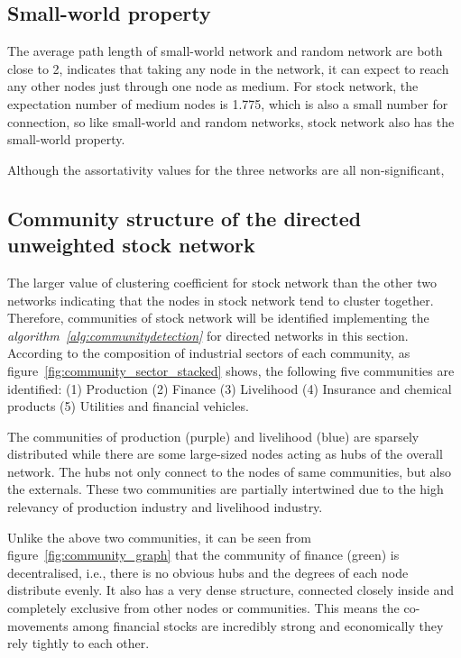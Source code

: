 \subsection{Small-world property}
The average path length of small-world network and random network are both close to 2, indicates that taking any node in the network, it can expect to reach any other nodes just through one node as medium. For stock network, the expectation number of medium nodes is 1.775, which is also a small number for connection, so like small-world and random networks, stock network also has the small-world property.


Although the assortativity values for the three networks are all non-significant, 

\subsection{Community structure of the directed unweighted stock network}
The larger value of clustering coefficient for stock network than the other two networks indicating that the nodes in stock network tend to cluster together. Therefore, communities of stock network will be identified implementing the \textit{algorithm~\ref{alg:communitydetection}} for directed networks in this section. According to the composition of industrial sectors of each community, as figure~\ref{fig:community_sector_stacked} shows, the following five communities are identified: (1) Production (2) Finance (3) Livelihood (4) Insurance and chemical products (5) Utilities and financial vehicles.

The communities of production (purple) and livelihood (blue) are sparsely distributed while there are some large-sized nodes acting as hubs of the overall network. The hubs not only connect to the nodes of same communities, but also the externals. These two communities are partially intertwined due to the high relevancy of production industry and livelihood industry. 

Unlike the above two communities, it can be seen from figure~\ref{fig:community_graph} that the community of finance (green) is decentralised, i.e., there is no obvious hubs and the degrees of each node distribute evenly. It also has a very dense structure, connected closely inside and completely exclusive from other nodes or communities. This means the co-movements among financial stocks are incredibly strong and economically they rely tightly to each other.

